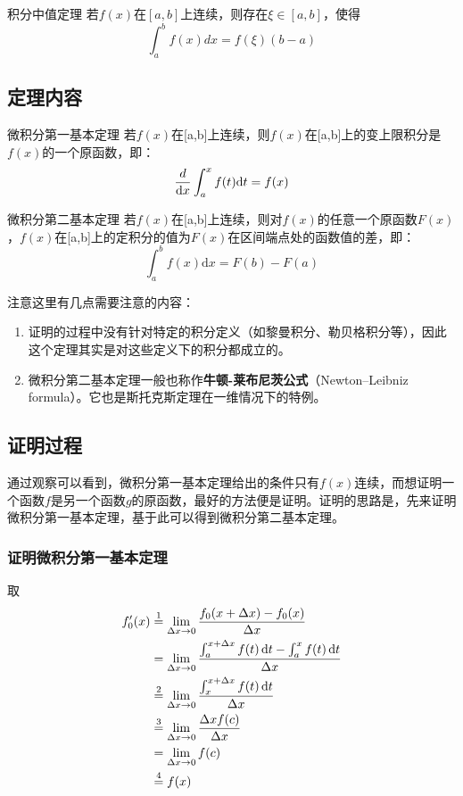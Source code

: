 \begin{lemma}{积分中值定理}
若$f(x)$在$[a,b]$上连续，则存在$\xi\in[a,b]$，使得
$$\int_{a}^{b} f(x)dx=f(\xi)(b-a)$$
\end{lemma}
\subsection{定理内容}

\begin{theorem}{微积分第一基本定理}
若$f(x)$在[a,b]上连续，则$f(x)$在[a,b]上的变上限积分是$f(x)$的一个原函数，即：
$${d\over\mathrm {d}x}\int_{a}^{x}f(t)\mathrm {d}t=f(x)$$
\end{theorem}

\begin{theorem}{微积分第二基本定理}
若$f(x)$在[a,b]上连续，则对$f(x)$的任意一个原函数$F(x)$，$f(x)$在[a,b]上的定积分的值为$F(x)$在区间端点处的函数值的差，即：
$$\int_{a}^{b} f(x)\mathrm {d}x=F(b)-F(a)$$
\end{theorem}

注意这里有几点需要注意的内容：
\begin{enumerate}
\item 证明的过程中没有针对特定的积分定义（如黎曼积分、勒贝格积分等），因此这个定理其实是对这些定义下的积分都成立的。
\item 微积分第二基本定理一般也称作\textbf{牛顿-莱布尼茨公式}（Newton–Leibniz formula）。它也是斯托克斯定理在一维情况下的特例。
\end{enumerate}

\subsection{证明过程}

通过观察可以看到，微积分第一基本定理给出的条件只有$f(x)$连续，而想证明一个函数$f$是另一个函数$g$的原函数，最好的方法便是证明。证明的思路是，先来证明微积分第一基本定理，基于此可以得到微积分第二基本定理。

\subsubsection{证明微积分第一基本定理}

取
$$\begin{align*}f_0'(x) &\overset{\mathrm{1}}{=} \lim_{\Delta x\to0}{f_0(x+\Delta x)-f_0(x)\over\Delta x} \\ 
&= \lim_{\Delta x\to0}{\int_{a}^{x+\Delta x} f(t)\, \mathrm {d}t-\int_{a}^{x} f(t)\, \mathrm {d}t\over\Delta x}\\ 
&\overset{\mathrm{2}}{=}\lim_{\Delta x\to0}{\int_{x}^{x+\Delta x} f(t)\, \mathrm {d}t\over\Delta x}\\
&\overset{\mathrm{3}}{=}\lim_{\Delta x\to0}{\Delta xf(c)\over\Delta x} \\ 
&=\lim_{\Delta x\to0}f(c)\\ 
&\overset{\mathrm{4}}{=}f(x)\end{align*}$$


